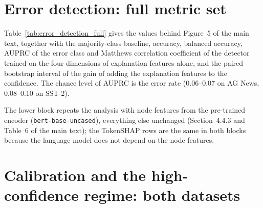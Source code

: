 \documentclass[review,12pt]{elsarticle}
\begin{document}
\section{Error detection: full metric set}

Table~\ref{tab:error_detection_full} gives the values behind Figure~5 of the main text, together with the majority-class baseline, accuracy, balanced accuracy, AUPRC of the error class and Matthews correlation coefficient of the detector trained on the four dimensions of explanation features alone, and the paired-bootstrap interval of the gain of adding the explanation features to the confidence. The chance level of AUPRC is the error rate (0.06--0.07 on AG News, 0.08--0.10 on SST-2).

The lower block repeats the analysis with node features from the pre-trained encoder (\texttt{bert-base-uncased}), everything else unchanged (Section~4.4.3 and Table~6 of the main text); the TokenSHAP rows are the same in both blocks because the language model does not depend on the node features.

\begin{table}[H]
\centering
\scriptsize
\setlength{\tabcolsep}{3.5pt}
\caption{Error detection with respect to the gold label, full metric set (10-fold stratified cross-validation, class-balanced logistic regression), with fine-tuned (upper block) and pre-trained (lower block) node features. Majority: accuracy of the detector that declares every prediction correct. Explanation: the four dimensions of explanation features. \(\Delta\): paired-bootstrap gain of the detector on confidence and explanation over the detector on confidence alone, with its 95\% interval.}
\label{tab:error_detection_full}
\end{table}

\section{Calibration and the high-confidence regime: both datasets}
\end{document}
